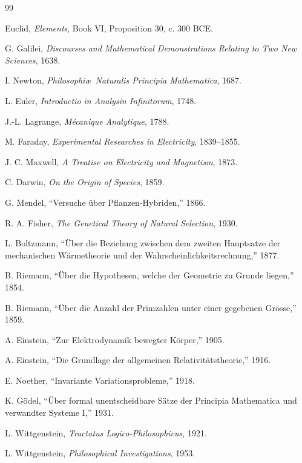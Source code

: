 \documentclass[11pt]{article}
\begin{document}
\begin{thebibliography}{99}

Euclid, \emph{Elements}, Book VI, Proposition 30, c. 300 BCE.

G. Galilei, \emph{Discourses and Mathematical Demonstrations Relating to Two New Sciences}, 1638.

I. Newton, \emph{Philosophi\ae\ Naturalis Principia Mathematica}, 1687.

L. Euler, \emph{Introductio in Analysin Infinitorum}, 1748.

J.-L. Lagrange, \emph{M\'ecanique Analytique}, 1788.

M. Faraday, \emph{Experimental Researches in Electricity}, 1839--1855.

J. C. Maxwell, \emph{A Treatise on Electricity and Magnetism}, 1873.

C. Darwin, \emph{On the Origin of Species}, 1859.

G. Mendel, ``Versuche \"uber Pflanzen-Hybriden,'' 1866.

R. A. Fisher, \emph{The Genetical Theory of Natural Selection}, 1930.

L. Boltzmann, ``\"Uber die Beziehung zwischen dem zweiten Hauptsatze der mechanischen W\"armetheorie und der Wahrscheinlichkeitsrechnung,'' 1877.

B. Riemann, ``\"Uber die Hypothesen, welche der Geometrie zu Grunde liegen,'' 1854.

B. Riemann, ``\"Uber die Anzahl der Primzahlen unter einer gegebenen Gr\"osse,'' 1859.

A. Einstein, ``Zur Elektrodynamik bewegter K\"orper,'' 1905.

A. Einstein, ``Die Grundlage der allgemeinen Relativit\"atstheorie,'' 1916.

E. Noether, ``Invariante Variationsprobleme,'' 1918.

K. G\"odel, ``\"Uber formal unentscheidbare S\"atze der Principia Mathematica und verwandter Systeme I,'' 1931.

L. Wittgenstein, \emph{Tractatus Logico-Philosophicus}, 1921.

L. Wittgenstein, \emph{Philosophical Investigations}, 1953.


\end{thebibliography}
\end{document}
